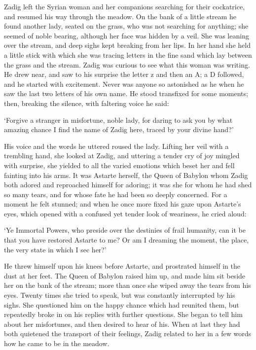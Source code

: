 \documentclass{article}
\begin{document}
\begin{center}
Zadig left the Syrian woman and her companions searching for their cockatrice, 
and resumed his way through the meadow. On the bank of a little stream he found 
another lady, seated on the grass, who was not searching for anything; she seemed 
of noble bearing, although her face was hidden by a veil. She was leaning over 
the stream, and deep sighs kept breaking from her lips. In her hand she held a 
little stick with which she was tracing letters in the fine sand which lay between 
the grass and the stream. Zadig was curious to see what this woman was writing. 
He drew near, and saw to his surprise the letter z and then an A; a D followed, 
and he started with excitement. Never was anyone so astonished as he when he saw 
the last two letters of his own name. He stood transfixed for some moments; then, 
breaking the silence, with faltering voice he said: 

`Forgive a stranger in misfortune, noble lady, for daring to ask you by what amazing 
chance I find the name of Zadig here, traced by your divine hand?' 

His voice and the words he uttered roused the lady. Lifting her veil with a trembling 
hand, she looked at Zadig, and uttering a tender cry of joy mingled with surprise, 
she yielded to all the varied emotions which beset her and fell fainting into his 
arms. It was Astarte herself, the Queen of Babylon whom Zadig both adored and reproached 
himself for adoring; it was she for whom he had shed so many tears, and for whose 
fate he had been so deeply concerned. For a moment he felt stunned; and when he 
once more fixed his gaze upon Astarte's eyes, which opened with a confused yet 
tender look of weariness, he cried aloud: 

`Ye Immortal Powers, who preside over the destinies of frail humanity, can it be 
that you have restored Astarte to me? Or am I dreaming the moment, the place, the 
very state in which I sec her?' 

He threw himself upon his knees before Astarte, and prostrated himself in the dust 
at her feet. The Queen of Babylon raised him up, and made him sit beside her on 
the bank of the stream; more than once she wiped away the tears from his eyes. 
Twenty times she tried to speak, but was constantly interrupted by his sighs. She 
questioned him on the happy chance which had reunited them, but repeatedly broke 
in on his replies with further questions. She began to tell him about her misfortunes, 
and then desired to hear of his. When at last they had both quietened the transport 
of their feelings, Zadig related to her in a few words how he came to be in the 
meadow. 


\end{center}
\end{document}
